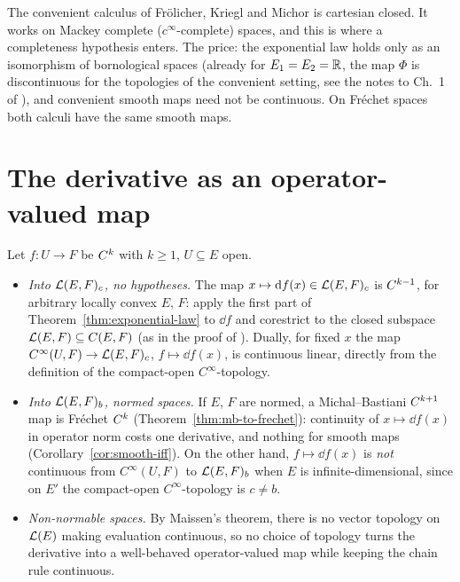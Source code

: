 \begin{remark}
  \label{rem:convenient}
  The convenient calculus of Frölicher, Kriegl and Michor \cite{KM97} is cartesian closed. It
  works on Mackey complete ($c^\infty$-complete) spaces, and this is where a completeness
  hypothesis enters. The price: the exponential law holds only as an isomorphism of
  bornological spaces (already for $E_1 = E_2 = \mathbb{R}$, the map $\Phi$ is discontinuous for the
  topologies of the convenient setting, see the notes to Ch.~1 of \cite{GN26}), and convenient
  smooth maps need not be continuous. On Fréchet spaces both calculi have the same smooth maps.
\end{remark}

\section{The derivative as an operator-valued map}

Let $f \colon U \to F$ be $C^{k}$ with $k \ge 1$, $U \subseteq E$ open.

\begin{itemize}
  \item \emph{Into $\mathcal{L}(E, F)_c$, no hypotheses.} The map $x \mapsto \mathrm{d} f(x) \in
    \mathcal{L}(E, F)_c$ is $C^{k-1}$, for arbitrary locally convex $E$, $F$: apply the first part of
    Theorem~\ref{thm:exponential-law} to $\dd f$ and corestrict to the closed subspace
    $\mathcal{L}(E, F) \subseteq C(E, F)$ (as in the proof of \cite[Prop.~2.3.17(b)]{GN26}). Dually,
    for fixed $x$ the map $C^\infty(U, F) \to \mathcal{L}(E, F)_c$, $f \mapsto \dd f(x)$, is
    continuous linear, directly from the definition of the compact-open $C^\infty$-topology.
  \item \emph{Into $\mathcal{L}(E, F)_b$, normed spaces.} If $E$, $F$ are normed, a Michal--Bastiani
    $C^{k+1}$ map is Fréchet $C^{k}$ (Theorem~\ref{thm:mb-to-frechet}): continuity of
    $x \mapsto \dd f(x)$ in operator norm costs one derivative, and nothing for smooth maps
    (Corollary~\ref{cor:smooth-iff}). On the other hand, $f \mapsto \dd f(x)$ is \emph{not}
    continuous from $C^\infty(U, F)$ to $\mathcal{L}(E, F)_b$ when $E$ is infinite-dimensional, since
    on $E'$ the compact-open $C^\infty$-topology is $c \ne b$.
  \item \emph{Non-normable spaces.} By Maissen's theorem, there is no vector topology on
    $\mathcal{L}(E)$ making evaluation continuous, so no choice of topology turns the derivative into
    a well-behaved operator-valued map while keeping the chain rule continuous.
\end{itemize}

